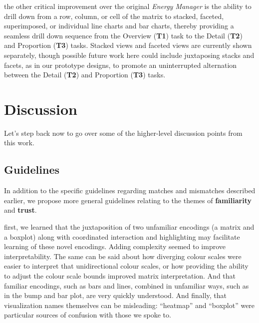 \documentclass[journal]{vgtc}                %
\newcommand{\bstart}[1]{\vspace{1mm} \noindent{\textbf{#1:}}}
\begin{document}
\bstart{Interactive drill-down} the other critical improvement over the original {\it Energy Manager} is the ability to drill down from a row, column, or cell of the matrix to stacked, faceted, superimposed, or individual line charts and bar charts, thereby providing a seamless drill down sequence from the Overview ({\bf T1}) task to the Detail ({\bf T2}) and Proportion ({\bf T3}) tasks.
Stacked views and faceted views are currently shown separately, though possible future work here could include juxtaposing stacks and facets, as in our prototype designs, to promote an uninterrupted alternation between the Detail ({\bf T2}) and Proportion ({\bf T3}) tasks.


\section{Discussion}
\label{discussion}


Let's step back now to go over some of the higher-level discussion points from this work.


\subsection{Guidelines}
\label{discussion-guidelines}


In addition to the specific guidelines regarding matches and mismatches described earlier, we propose more general guidelines relating to the themes of {\bf familiarity} and {\bf trust}.

\bstart{Familiarity} first, we learned that the juxtaposition of two unfamiliar encodings (a matrix and a boxplot) along with coordinated interaction and highlighting may facilitate learning of these novel encodings. 
Adding complexity seemed to improve interpretability. 
The same can be said about how diverging colour scales were easier to interpret that unidirectional colour scales, or how providing the ability to adjust the colour scale bounds improved matrix interpretation.
And that familiar encodings, such as bars and lines, combined in unfamiliar ways, such as in the bump and bar plot, are very quickly understood.
And finally, that visualization names themselves can be misleading: ``heatmap'' and ``boxplot'' were particular sources of confusion with those we spoke to.
\end{document}
